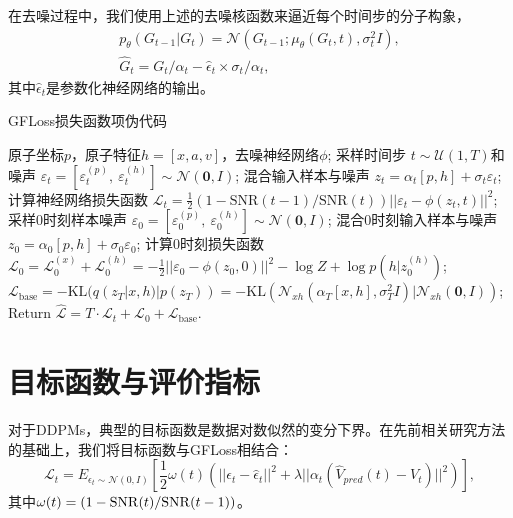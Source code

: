 在去噪过程中，我们使用上述的去噪核函数来逼近每个时间步的分子构象，
\begin{eqnarray}
    &p_\theta(G_{t-1}|G_t) = \mathcal{N}(G_{t-1}; \mu_\theta(G_t,t),\sigma_t^2 I),& \\
    &\hat{G}_t = G_t / \alpha_t - \hat{\epsilon}_t \times \sigma_t / \alpha_t ,&
\end{eqnarray}
其中$\hat{\epsilon}_t$是参数化神经网络的输出。

\begin{algorithm}[H]
    \caption{GFLoss损失函数项伪代码}
    \label{alg:gfloss}
    \begin{algorithmic}
     原子坐标$p$，原子特征$h = [x, a, v]$，去噪神经网络$\phi$;
    \STATE 采样时间步 $t \sim \mathcal{U}(1, T)$和噪声 $\varepsilon_t = [\varepsilon^{(p)}_t, ~\varepsilon^{(h)}_t] \sim \mathcal{N}(\mathbf{0}, I)$;
    \STATE 混合输入样本与噪声 $z_t = \alpha_t [p, h] + \sigma_t \varepsilon_t$;
    \STATE 计算神经网络损失函数 $\mathcal{L}_t = \frac{1}{2}(1 - \mathrm{SNR}(t-1) / \mathrm{SNR}(t)) ||\varepsilon_t - \phi(z_t, t)||^2$;
    \STATE 采样0时刻样本噪声 $\varepsilon_0 = [\varepsilon^{(p)}_0, ~\varepsilon^{(h)}_0] \sim \mathcal{N}(\mathbf{0}, I)$;
    \STATE 混合0时刻输入样本与噪声 $z_0 = \alpha_0 [p, h] + \sigma_0 \varepsilon_0$;
    \STATE 计算0时刻损失函数 $\mathcal{L}_0 = \mathcal{L}_0^{(x)} + \mathcal{L}_0^{(h)} = -\frac{1}{2} ||\varepsilon_0 - \phi(z_0, 0)||^2 - \log Z + \log p(h | z_0^{(h)})$;
    \STATE $\mathcal{L}_{\text{base}} = -\mathrm{KL}(q(z_T | x, h) | p(z_T)) = -\mathrm{KL}(\mathcal{N}_{xh}(\alpha_T [x, h], \sigma_T^2 I) | \mathcal{N}_{xh}(\mathbf{0}, I))$;
    \STATE Return $\hat{\mathcal{L}} = T \cdot \mathcal{L}_t + \mathcal{L}_0 + \mathcal{L}_{\text{base}}$.
    \end{algorithmic}
\end{algorithm}

\section{目标函数与评价指标}

对于DDPMs，典型的目标函数是数据对数似然的变分下界。在先前相关研究方法的基础上，我们将目标函数与GFLoss相结合：
\begin{equation}
    \mathcal{L}_t = E_{\epsilon_t \sim \mathcal{N}(0, I)} \left[ \frac{1}{2} \omega(t) \left( ||\epsilon_t - \hat{\epsilon}_t||^2 + \lambda || \alpha_t(\hat{V}_{pred}(t) - V_t)||^2 \right) \right],
\end{equation}
其中$\omega(t) = (1-{\rm SNR}(t)/{\rm SNR}(t-1))$。

